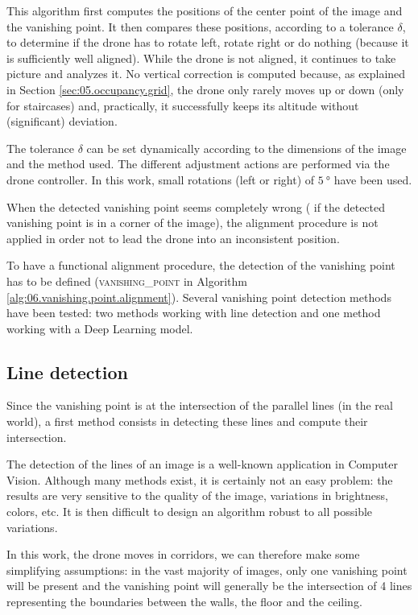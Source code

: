 This algorithm first computes the positions of the center point of the image and the vanishing point. It then compares these positions, according to a tolerance $\delta$, to determine if the drone has to rotate left, rotate right or do nothing (because it is sufficiently well aligned). While the drone is not aligned, it continues to take picture and analyzes it. No vertical correction is computed because, as explained in Section \ref{sec:05.occupancy.grid}, the drone only rarely moves up or down (only for staircases) and, practically, it successfully keeps its altitude without (significant) deviation.

The tolerance $\delta$ can be set dynamically according to the dimensions of the image and the method used. The different adjustment actions are performed via the drone controller. In this work, small rotations (left or right) of $\SI{5}{\degree}$ have been used.

\begin{note}
    When the detected vanishing point seems completely wrong (\eg{} if the detected vanishing point is in a corner of the image), the alignment procedure is not applied in order not to lead the drone into an inconsistent position.
\end{note}

To have a functional alignment procedure, the detection of the vanishing point has to be defined (\textsc{vanishing\_point} in Algorithm \ref{alg:06.vanishing.point.alignment}). Several vanishing point detection methods have been tested: two methods working with line detection and one method working with a Deep Learning model.

\subsection{Line detection}\label{sec:06.line.detection}

Since the vanishing point is at the intersection of the parallel lines (in the real world), a first method consists in detecting these lines and compute their intersection.

The detection of the lines of an image is a well-known application in Computer Vision. Although many methods exist, it is certainly not an easy problem: the results are very sensitive to the quality of the image, variations in brightness, colors, etc. It is then difficult to design an algorithm robust to all possible variations.

In this work, the drone moves in corridors, we can therefore make some simplifying assumptions: in the vast majority of images, only one vanishing point will be present and the vanishing point will generally be the intersection of 4 lines representing the boundaries between the walls, the floor and the ceiling.

